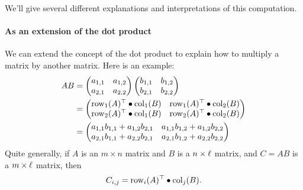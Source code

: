 \documentclass{ximera}
\begin{document}
We'll give several different explanations and interpretations of this
computation.

\paragraph{As an extension of the dot product}
We can extend the concept of the dot product to explain how to
multiply a matrix by another matrix. Here is an example:
\begin{align*}AB &= \begin{pmatrix}
a_{1,1} & a_{1,2}\\
a_{2,1} & a_{2,2}
\end{pmatrix}
\begin{pmatrix}
b_{1,1} & b_{1,2}\\
b_{2,1} & b_{2,2}
\end{pmatrix}\\
&= \begin{pmatrix}
\operatorname{row}_1(A)^\top \bullet\operatorname{col}_1(B) & \operatorname{row}_1(A)^\top\bullet\operatorname{col}_2(B)\\
\operatorname{row}_2(A)^\top \bullet\operatorname{col}_1(B) & \operatorname{row}_2(A)^\top\bullet\operatorname{col}_2(B)
\end{pmatrix}\\
&= \begin{pmatrix}
a_{1,1}b_{1,1} + a_{1,2}b_{2,1} & a_{1,1}b_{1,2}+ a_{1,2}b_{2,2}\\
a_{2,1}b_{1,1} + a_{2,2}b_{2,1} & a_{2,1}b_{1,2} + a_{2,2}b_{2,2}
\end{pmatrix}
\end{align*}
Quite generally, if $A$ is an $m\times n$ matrix and $B$ is a $n\times
\ell$ matrix, and $C = AB$ is a $m\times \ell$ matrix, then
\[
C_{i,j} = \operatorname{row}_i(A)^\top\bullet \operatorname{col}_j(B).
\]
\end{document}
